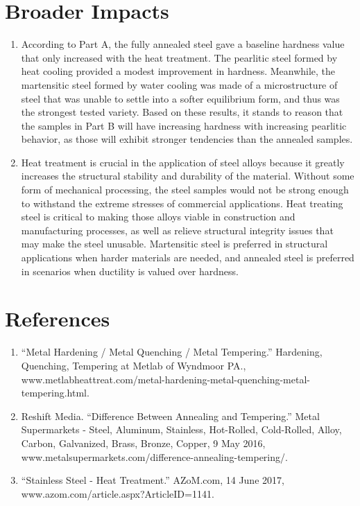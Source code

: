 \documentclass{article}
\begin{document}
\section{Broader Impacts}
\begin{enumerate}
\item According to Part A, the fully annealed steel gave a baseline hardness value that only increased with the heat treatment. The pearlitic steel formed by heat cooling provided a modest improvement in hardness. Meanwhile, the martensitic steel formed by water cooling was made of a microstructure of steel that was unable to settle into a softer equilibrium form, and thus was the strongest tested variety. Based on these results, it stands to reason that the samples in Part B will have increasing hardness with increasing pearlitic behavior, as those will exhibit stronger tendencies than the annealed samples.

\item Heat treatment is crucial in the application of steel alloys because it greatly increases the structural stability and durability of the material. Without some form of mechanical processing, the steel samples would not be strong enough to withstand the extreme stresses of commercial applications. Heat treating steel is critical to making those alloys viable in construction and manufacturing processes, as well as relieve structural integrity issues that may make the steel unusable. Martensitic steel is preferred in structural applications when harder materials are needed, and annealed steel is preferred in scenarios when ductility is valued over hardness.
\end{enumerate}

\section{References}
\begin{enumerate}
\item “Metal Hardening / Metal Quenching / Metal Tempering.” Hardening, Quenching, Tempering at 
Metlab of Wyndmoor PA., www.metlabheattreat.com/metal-hardening-metal-quenching-metal-tempering.html.

\item Reshift Media. “Difference Between Annealing and Tempering.” Metal Supermarkets - Steel, 
Aluminum, Stainless, Hot-Rolled, Cold-Rolled, Alloy, Carbon, Galvanized, Brass, Bronze, Copper, 9 May 2016, www.metalsupermarkets.com/difference-annealing-tempering/.

\item “Stainless Steel - Heat Treatment.” AZoM.com, 14 June 2017, 
www.azom.com/article.aspx?ArticleID=1141.

\end{enumerate}
\end{document}
